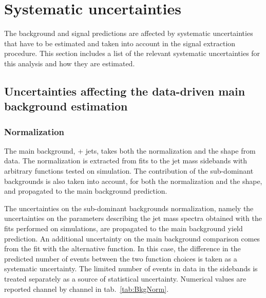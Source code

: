 \section{Systematic uncertainties}
\label{sec:uncertainties}

The background and signal predictions are affected by systematic uncertainties that have to be estimated and taken into account in the signal extraction procedure. This section includes a list of the relevant systematic uncertainties for this analysis and how they are estimated.%


\subsection{Uncertainties affecting the data-driven main background estimation}

\subsubsection{Normalization}

The main background, \V + jets, takes both the normalization and the shape from data. The normalization is extracted from fits to the jet mass sidebands with arbitrary functions tested on simulation. The contribution of the sub-dominant backgrounds is also taken into account, for both the normalization and the shape, and propagated to the main background prediction.

\noindent The uncertainties on the sub-dominant backgrounds normalization, namely the uncertainties on the parameters describing the jet mass spectra obtained with the fits performed on simulations, are propagated to the main background yield prediction. An additional uncertainty on the main background comparison comes from the fit with the alternative function. In this case, the difference in the predicted number of events between the two function choices is taken as a systematic uncertainty. The limited number of events in data in the sidebands is treated separately as a source of statistical uncertainty. Numerical values are reported channel by channel in tab.~\ref{tab:BkgNorm}.


